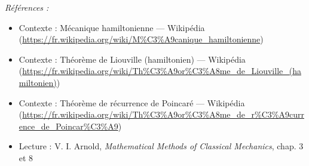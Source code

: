 \documentclass[11pt]{article}
\newenvironment{refs}{\par\small\noindent\emph{Références :}\begin{itemize}\setlength\itemsep{0pt}}{\end{itemize}\normalsize}
\begin{document}
\begin{refs}
\item Contexte : Mécanique hamiltonienne --- Wikipédia (\url{https://fr.wikipedia.org/wiki/M%C3%A9canique_hamiltonienne})
\item Contexte : Théorème de Liouville (hamiltonien) --- Wikipédia (\url{https://fr.wikipedia.org/wiki/Th%C3%A9or%C3%A8me_de_Liouville_(hamiltonien)})
\item Contexte : Théorème de récurrence de Poincaré --- Wikipédia (\url{https://fr.wikipedia.org/wiki/Th%C3%A9or%C3%A8me_de_r%C3%A9currence_de_Poincar%C3%A9})
\item Lecture : V. I. Arnold, \textit{Mathematical Methods of Classical Mechanics}, chap. 3 et 8
\end{refs}

\bigskip
\end{document}
